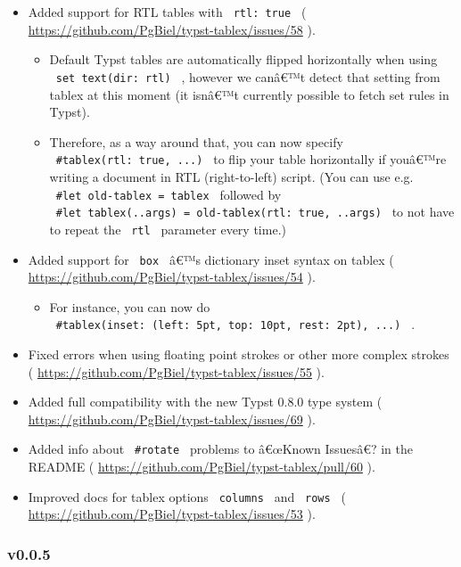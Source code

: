 \begin{itemize}
\tightlist
\item
  Added support for RTL tables with \texttt{\ rtl:\ true\ } (
  \url{https://github.com/PgBiel/typst-tablex/issues/58} ).

  \begin{itemize}
  \tightlist
  \item
    Default Typst tables are automatically flipped horizontally when
    using \texttt{\ set\ text(dir:\ rtl)\ } , however we canâ€™t detect
    that setting from tablex at this moment (it isnâ€™t currently
    possible to fetch set rules in Typst).
  \item
    Therefore, as a way around that, you can now specify
    \texttt{\ \#tablex(rtl:\ true,\ ...)\ } to flip your table
    horizontally if youâ€™re writing a document in RTL (right-to-left)
    script. (You can use e.g. \texttt{\ \#let\ old-tablex\ =\ tablex\ }
    followed by
    \texttt{\ \#let\ tablex(..args)\ =\ old-tablex(rtl:\ true,\ ..args)\ }
    to not have to repeat the \texttt{\ rtl\ } parameter every time.)
  \end{itemize}
\item
  Added support for \texttt{\ box\ } â€™s dictionary inset syntax on
  tablex ( \url{https://github.com/PgBiel/typst-tablex/issues/54} ).

  \begin{itemize}
  \tightlist
  \item
    For instance, you can now do
    \texttt{\ \#tablex(inset:\ (left:\ 5pt,\ top:\ 10pt,\ rest:\ 2pt),\ ...)\ }
    .
  \end{itemize}
\item
  Fixed errors when using floating point strokes or other more complex
  strokes ( \url{https://github.com/PgBiel/typst-tablex/issues/55} ).
\item
  Added full compatibility with the new Typst 0.8.0 type system (
  \url{https://github.com/PgBiel/typst-tablex/issues/69} ).
\item
  Added info about \texttt{\ \#rotate\ } problems to â€œKnown Issuesâ€?
  in the README ( \url{https://github.com/PgBiel/typst-tablex/pull/60}
  ).
\item
  Improved docs for tablex options \texttt{\ columns\ } and
  \texttt{\ rows\ } (
  \url{https://github.com/PgBiel/typst-tablex/issues/53} ).
\end{itemize}

\subsubsection{v0.0.5}\label{v0.0.5}

